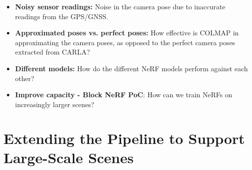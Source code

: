 \begin{itemize}
    \item \textbf{Noisy sensor readings:} Noise in the camera pose due to inaccurate readings from the GPS/GNSS.
    \item \textbf{Approximated poses vs. perfect poses:} How effective is COLMAP in approximating the camera poses, as opposed to the perfect camera poses extracted from CARLA?
    \item \textbf{Different models:} How do the different NeRF models perform against each other?
    \item \textbf{Improve capacity - Block NeRF PoC}: How can we train NeRFs on increasingly larger scenes?
\end{itemize}




















































\section{Extending the Pipeline to Support Large-Scale Scenes} \label{sec:method-block-nerf}

\begin{comment}
Premise: Have found the CARLA-baseline to work well on shorter segments. As discussed multiple papers, the capacity is limited.
Premise \#2: Since I operate in a synthetic environment, I have perfect poses which simplifies the process.
Question: How do I implement Block-NeRF in Nerfstudio, given perfect poses?

\begin{itemize}
    \item Split the dataset into multiple datasets
    \item Train each seperately
    \item Create a camera path
    \item Render the camera path for each NeRF
\end{itemize}
\end{comment}

